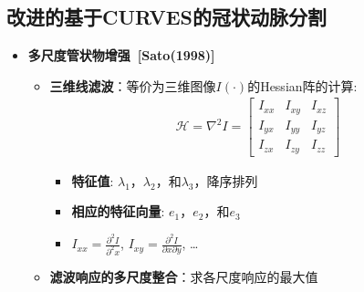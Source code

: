 \subsection[冠状动脉分割II]{改进的基于CURVES的冠状动脉分割}

\begin{frame}
\begin{itemize}
\item \textbf{多尺度管状物增强~[Sato(1998)]}
\begin{itemize}
\pause \item \textbf{三维线滤波}：等价为三维图像$I(\cdot)$的Hessian阵的计算:
\begin{gather*}
\mathcal{H} = \nabla^2 I =
\begin{bmatrix}
I_{xx} & I_{xy} & I_{xz} \\ I_{yx} & I_{yy} & I_{yz} \\ I_{zx} & I_{zy} & I_{zz}
\end{bmatrix}
\end{gather*}
\begin{itemize}
\item \textbf{特征值}: $\lambda_1$，$\lambda_2$，和$\lambda_3$，降序排列
\item \textbf{相应的特征向量}: $e_1$，$e_2$，和$e_3$
\item $I_{xx} = \frac{\partial^2 I}{\partial^2 x}$, $I_{xy} = \frac{\partial^2 I}{\partial x \partial y}$, \dots
\end{itemize}
\pause \item \textbf{滤波响应的多尺度整合}：求各尺度响应的最大值
\end{itemize}
\end{itemize}
\end{frame}

